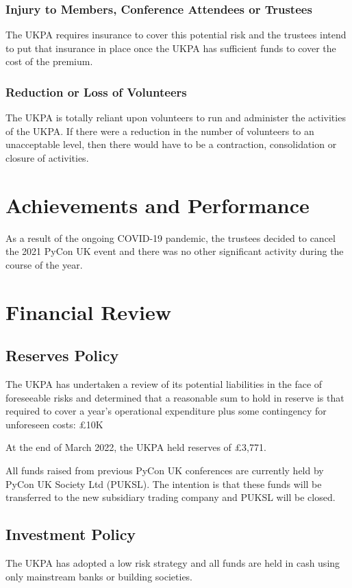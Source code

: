\documentclass[11pt, final]{article}
\begin{document}
            \subsubsection{Injury to Members, Conference Attendees or Trustees}
            The UKPA requires insurance to cover this potential risk and the trustees intend to put that insurance in place once the UKPA has sufficient funds to cover the cost of the premium.

            \subsubsection{Reduction or Loss of Volunteers}
            The UKPA is totally reliant upon volunteers to run and administer the activities of the UKPA. If there were a reduction in the number of volunteers to an unacceptable level, then there would have to be a contraction, consolidation or closure of activities.

    \section{Achievements and Performance}
    	As a result of the ongoing COVID-19 pandemic, the trustees decided to cancel the 2021 PyCon UK event and there was no other significant activity during the course of the year.
    \section{Financial Review}

        \subsection{Reserves Policy}
		The UKPA has undertaken a review of its potential liabilities in the face of foreseeable risks and determined that a reasonable sum to hold in reserve is that required to cover a year's operational expenditure plus some contingency for unforeseen costs: \pounds10K

        At the end of March 2022, the UKPA held reserves of \pounds 3,771.

        All funds raised from previous PyCon UK conferences are currently held by PyCon UK Society Ltd (PUKSL). The intention is that these funds will be transferred to the new subsidiary trading company and PUKSL will be closed.

        \subsection{Investment Policy}
        The UKPA has adopted a low risk strategy and all funds are held in cash using only mainstream banks or building societies.
\end{document}
